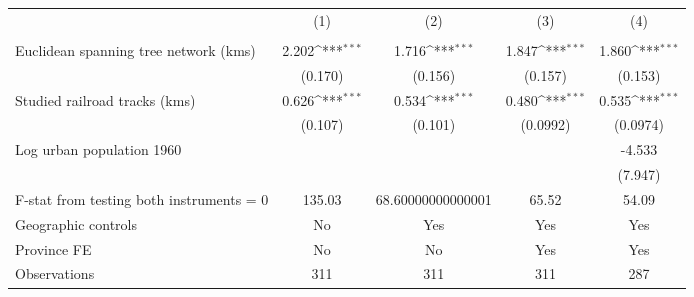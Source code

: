 {
\def\sym#1{\ifmmode^{#1}\else\(^{#1}\)\fi}
\begin{tabular}{l*{4}{c}}
\hline\hline
                &\multicolumn{1}{c}{(1)}&\multicolumn{1}{c}{(2)}&\multicolumn{1}{c}{(3)}&\multicolumn{1}{c}{(4)}\\
                &\multicolumn{1}{c}{}&\multicolumn{1}{c}{}&\multicolumn{1}{c}{}&\multicolumn{1}{c}{}\\
\hline
Euclidean spanning tree network (kms)&    2.202\sym{***}&    1.716\sym{***}&    1.847\sym{***}&    1.860\sym{***}\\
                &  (0.170)         &  (0.156)         &  (0.157)         &  (0.153)         \\
[1em]
Studied railroad tracks (kms)&    0.626\sym{***}&    0.534\sym{***}&    0.480\sym{***}&    0.535\sym{***}\\
                &  (0.107)         &  (0.101)         & (0.0992)         & (0.0974)         \\
[1em]
Log urban population 1960&                  &                  &                  &   -4.533         \\
                &                  &                  &                  &  (7.947)         \\
\hline
F-stat from testing both instruments = 0&   135.03         &68.60000000000001         &    65.52         &    54.09         \\
Geographic controls&       No         &      Yes         &      Yes         &      Yes         \\
Province FE     &       No         &       No         &      Yes         &      Yes         \\
Observations    &      311         &      311         &      311         &      287         \\
\hline\hline
\end{tabular}
}

